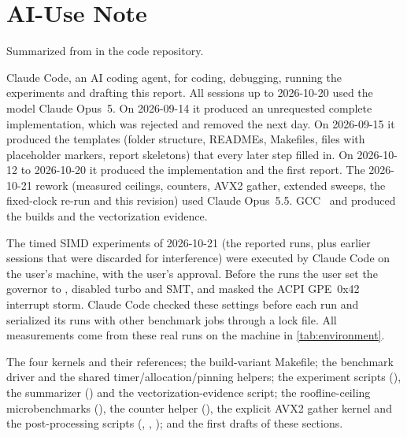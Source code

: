 \section{AI-Use Note}\label{sec:ai-use}

Summarized from  in the code repository.

\begin{description}[style=nextline]
  \item[Tools used] Claude Code, an AI coding agent, for coding, debugging, running the experiments
        and drafting this report. All sessions up to 2026-10-20 used the model Claude Opus~5. On
        2026-09-14 it produced an unrequested complete implementation, which was rejected and removed
        the next day. On 2026-09-15 it produced the templates (folder structure, READMEs, Makefiles,
        files with placeholder markers, report skeletons) that every later step filled in. On 2026-10-12 to
        2026-10-20 it produced the implementation and the first report. The 2026-10-21 rework (measured ceilings,
        counters, AVX2 gather, extended sweeps, the fixed-clock re-run and this revision) used
        Claude Opus~5.5. GCC~\sysGCC{} and  produced the builds and the
        vectorization evidence.
  \item[Who ran the measurements] The timed SIMD experiments of 2026-10-21 (the reported runs, plus earlier sessions that
        were discarded for interference) were executed by Claude
        Code on the user's machine, with the user's approval. Before the runs the user set the
        governor to , disabled turbo and SMT, and masked the ACPI GPE~0x42
        interrupt storm. Claude Code checked these settings before each run and serialized its runs with
        other benchmark jobs through a lock file. All measurements come from these real runs on
        the machine in \cref{tab:environment}.
  \item[What they helped generate] The four kernels and their references; the build-variant
        Makefile; the benchmark driver and the shared timer/allocation/pinning helpers; the
        experiment scripts (), the summarizer () and the
        vectorization-evidence script; the roofline-ceiling microbenchmarks
        (), the  counter helper (), the
        explicit AVX2 gather kernel and the post-processing scripts (,
        , ); and the first drafts of these sections.

\end{description}
